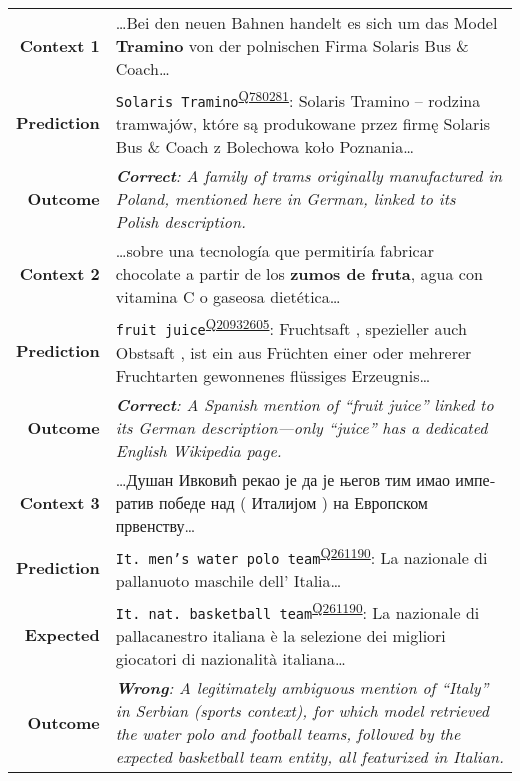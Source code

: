 \documentclass[11pt,a4paper]{article}
\newcommand{\entity}[1]{\texttt{#1}}
\newcommand{\ientity}[2]{\entity{#1}\textsuperscript{\href{https://www.wikidata.org/wiki/#2}{#2}}}
\begin{document}
\begin{table*}
\small
\centering
\begin{tabular}{r L{.86\textwidth}} \toprule
  \textbf{Context 1} & \ldots Bei den neuen Bahnen handelt es sich um das Model \textbf{Tramino} von der polnischen Firma Solaris Bus \& Coach\ldots \\ \cmidrule(lr){2-2}
  \textbf{Prediction} & \ientity{Solaris Tramino}{Q780281}: Solaris Tramino -- rodzina tramwajów, które są produkowane przez firmę Solaris Bus \& Coach z Bolechowa koło Poznania\ldots \\ \cmidrule(lr){2-2}
  \textbf{Outcome} & \emph{\textbf{Correct}: A family of trams originally manufactured in Poland, mentioned here in German, linked to its Polish description.} \\ \midrule
      
  \textbf{Context 2} & \ldots sobre una tecnología que permitiría fabricar chocolate a partir de los \textbf{zumos de fruta}, agua con vitamina C o gaseosa dietética\ldots   \\ \cmidrule(lr){2-2}
  \textbf{Prediction} & \ientity{fruit juice}{Q20932605}: Fruchtsaft , spezieller auch Obstsaft , ist ein aus Früchten einer oder mehrerer Fruchtarten gewonnenes flüssiges Erzeugnis\ldots  \\ \cmidrule(lr){2-2}
  \textbf{Outcome} & \emph{\textbf{Correct}: A Spanish mention of ``fruit juice'' linked to its German description---only ``juice'' has a dedicated English Wikipedia page.} \\ \midrule

  \textbf{Context 3} & 
  \foreignlanguage{russian}{\ldots Душан Ивковић рекао је да је његов тим имао императив победе над ( Италијом ) на Европском првенству\ldots } \\  \cmidrule(lr){2-2}
  \textbf{Prediction} & \ientity{It.\ men's water polo team}{Q261190}: La nazionale di pallanuoto maschile dell' Italia\ldots  \\ \cmidrule(lr){2-2}
  \textbf{Expected} & \ientity{It.\ nat.\ basketball team}{Q261190}: La nazionale di pallacanestro italiana è la selezione dei migliori giocatori di nazionalità italiana\ldots  \\ \cmidrule(lr){2-2}
  \textbf{Outcome} & \emph{\textbf{Wrong}: A legitimately ambiguous mention of ``Italy'' in Serbian (sports context),
  for which model retrieved the water polo and football teams, followed by the expected basketball team entity, all featurized in Italian.} 
  \\\midrule


\end{tabular}
\end{table*}
\end{document}
